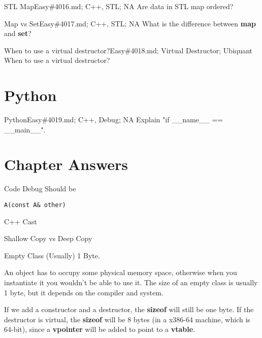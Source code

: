 \documentclass[oldfontcommands]{memoir}
\begin{document}
{\begin{question}{STL Map}{Easy}{\#4016.md; C++, STL; NA}
Are data in STL map ordered?

\end{question}

\begin{question}{Map vs Set}{Easy}{\#4017.md; C++, STL; NA}
What is the difference between {\bf{map}} and {\bf{set}}?

\end{question}

\begin{question}{When to use a virtual destructor?}{Easy}{\#4018.md; Virtual Destructor; Ubiquant}
When to use a virtual destructor?

\end{question}

\section{Python}
\begin{question}{Python}{Easy}{\#4019.md; C++, Debug; NA}
Explain "if \_\_name\_\_ == \_\_main\_\_".

\end{question}

\newpage\section{Chapter Answers}\begin{answer}{Code Debug}
Should be
\begin{verbatim}
A(const A& other)
\end{verbatim}
\end{answer}
\begin{answer}{C++ Cast}
\end{answer}
\begin{answer}{Shallow Copy vs Deep Copy}
\end{answer}
\begin{answer}{Empty Class}
(Usually) 1 Byte.

An object has to occupy some physical memory space, otherwise when you instantiate it you wouldn't be able to use it. The size of an empty class is usually 1 byte, but it depends on the compiler and system.

If we add a constructor and a destructor, the {\bf{sizeof}} will still be one byte. If the destructor is virtual, the {\bf{sizeof}} will be 8 bytes (in a x386-64 machine, which is 64-bit), since a {\bf{vpointer}} will be added to point to a {\bf{vtable}}.


\end{answer}}
\end{document}
